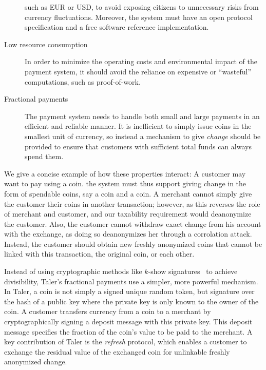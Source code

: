 \documentclass{llncs}
\begin{document}
\begin{description}
    such as EUR or USD, to avoid exposing citizens to unnecessary risks
    from currency fluctuations.
    Moreover, the system must have an open protocol specification and
    a free software reference implementation.
  \item[Low resource consumption]
    In order to minimize the operating costs and environmental impact of
    the payment system, it should avoid the reliance on expensive or
    ``wasteful'' computations, such as proof-of-work.
  \item[Fractional payments]
    The payment system needs to handle both small and large payments in
    an efficient and reliable manner.  It is inefficient to simply issue
    coins in the smallest unit of currency, so instead a mechanism to
    give {\em change} should be provided to ensure that customers with
    sufficient total funds can always spend them.
\end{description}
%
We give a concise example of how these properties interact:
A customer may want to pay  using a  coin.
the system must thus support giving change in the form of spendable coins,
say a  coin and a  coin.
A merchant cannot simply give the customer their coins in another transaction;
however, as this reverses the role of merchant and customer, and
our taxability requirement would deanonymize the customer.  
Also, the customer cannot withdraw exact change from his account with
the exchange, as doing so deanonymizes her through a corrolation attack.
Instead, the customer should obtain new freshly anonymized coins that cannot be
linked with this transaction, the original  coin, or each other.

Instead of using cryptographic methods like $k$-show
signatures~\cite{brands1993efficient} to achieve divisibility,
Taler's fractional payments use a simpler, more powerful mechanism.
In Taler, a coin is not simply a signed unique random token, but signature
over the hash of a public key where the private key is only known to the owner
of the coin.
A customer transfers currency from a coin to a merchant by cryptographically
signing a deposit message with this private key.  This deposit message
specifies the fraction of the coin's value to be paid to the merchant.
A key contribution of Taler is the {\em refresh} protocol, which enables
a customer to exchange the residual value of the exchanged coin for
unlinkable freshly anonymized change.
\end{document}
